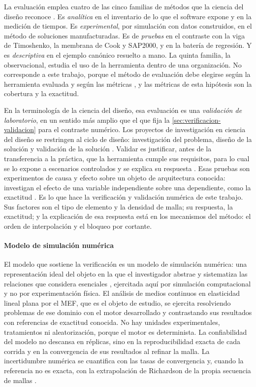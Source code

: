 La evaluación emplea cuatro de las cinco familias de métodos que la ciencia del diseño reconoce \autocite[p.~86]{hevner2004design}. Es \emph{analítica} en el inventario de lo que el software expone y en la medición de tiempos. Es \emph{experimental}, por simulación con datos construidos, en el método de soluciones manufacturadas. Es de \emph{pruebas} en el contraste con la viga de Timoshenko, la membrana de Cook y SAP2000, y en la batería de regresión. Y es \emph{descriptiva} en el ejemplo canónico resuelto a mano. La quinta familia, la observacional, estudia el uso de la herramienta dentro de una organización. No corresponde a este trabajo, porque el método de evaluación debe elegirse según la herramienta evaluada y según las métricas \autocite[p.~86]{hevner2004design}, y las métricas de esta hipótesis son la cobertura y la exactitud.

En la terminología de la ciencia del diseño, esa evaluación es una \emph{validación de laboratorio}, en un sentido más amplio que el que fija la \autoref{sec:verificacion-validacion} para el contraste numérico. Los proyectos de investigación en ciencia del diseño se restringen al ciclo de diseño: investigación del problema, diseño de la solución y validación de la solución \autocite[p.~30]{wieringa2014design}. Validar es justificar, antes de la transferencia a la práctica, que la herramienta cumple sus requisitos, para lo cual se lo expone a escenarios controlados y se explica su respuesta \autocite[p.~31]{wieringa2014design}. Esas pruebas son experimentos de causa y efecto sobre un objeto de arquitectura conocida: investigan el efecto de una variable independiente sobre una dependiente, como la exactitud \autocite[p.~247]{wieringa2014design}. Es lo que hace la verificación y validación numérica de este trabajo. Sus factores son el tipo de elemento y la densidad de malla; su respuesta, la exactitud; y la explicación de esa respuesta está en los mecanismos del método: el orden de interpolación y el bloqueo por cortante.

\paragraph{Modelo de simulación numérica} El modelo que sostiene la verificación es un modelo de simulación numérica: una representación ideal del objeto en la que el investigador abstrae y sistematiza las relaciones que considera esenciales \autocite[p.~21]{alvarez_metodologia}, ejercitada aquí por simulación computacional y no por experimentación física. El análisis de medios continuos en elasticidad lineal plana por el MEF, que es el objeto de estudio, se ejercita resolviendo problemas de ese dominio con el motor desarrollado y contrastando sus resultados con referencias de exactitud conocida. No hay unidades experimentales, tratamientos ni aleatorización, porque el motor es determinista. La confiabilidad del modelo no descansa en réplicas, sino en la reproducibilidad exacta de cada corrida y en la convergencia de sus resultados al refinar la malla. La incertidumbre numérica se cuantifica con las tasas de convergencia y, cuando la referencia no es exacta, con la extrapolación de Richardson de la propia secuencia de mallas \autocite[pp.~309-312]{oberkampf2010vv}.

